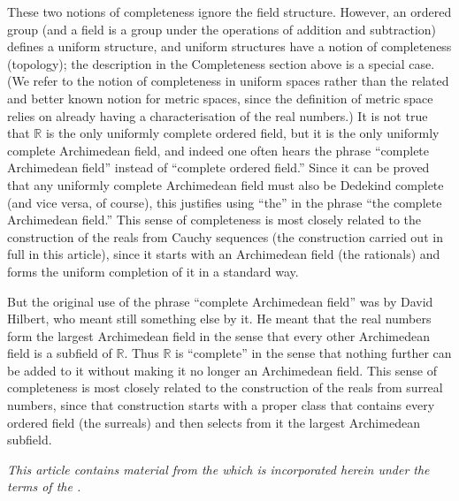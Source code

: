 \documentclass[12pt]{article}
\begin{document}
These two notions of completeness ignore the field structure. However, an
ordered group (and a field is a group under the operations of addition and
subtraction) defines a uniform structure, and uniform structures have a notion
of completeness (topology); the description in the Completeness section above
is a special case. (We refer to the notion of completeness in uniform spaces
rather than the related and better known notion for metric spaces, since the
definition of metric space relies on already having a characterisation of the
real numbers.) It is not true that $\mathbb{R}$ is the only uniformly complete
ordered
field, but it is the only uniformly complete Archimedean field, and indeed one
often hears the phrase ``complete Archimedean field'' instead of ``complete
ordered field.'' Since it can be proved that any uniformly complete Archimedean
field must also be Dedekind complete (and vice versa, of course), this
justifies using ``the'' in the phrase ``the complete Archimedean field.'' This
sense of completeness is most closely related to the construction of the reals
from Cauchy sequences (the construction carried out in full in this article),
since it starts with an Archimedean field (the rationals) and forms the uniform
completion of it in a standard way.
                                                                                
But the original use of the phrase ``complete Archimedean field'' was by David
Hilbert, who meant still something else by it. He meant that the real numbers
form the largest Archimedean field in the sense that every other Archimedean
field is a subfield of $\mathbb{R}$. Thus $\mathbb{R}$ is ``complete'' in the
sense that nothing
further can be added to it without making it no longer an Archimedean field.
This sense of completeness is most closely related to the construction of the
reals from surreal numbers, since that construction starts with a proper class
that contains every ordered field (the surreals) and then selects from it the
largest Archimedean subfield.

\emph{This article contains material from the  which is incorporated herein under the terms of the .}
\end{document}
